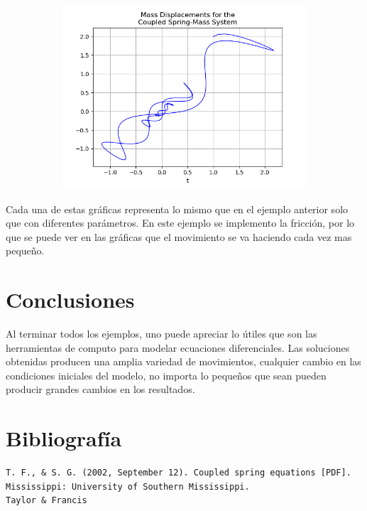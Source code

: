 \documentclass{article}
\begin{document}
\begin{figure}[h!]
\begin{subfigure}[b]{0.45\linewidth}
    \caption{}
  \end{subfigure}
  \begin{subfigure}[b]{0.5\linewidth}
    \includegraphics[width=\linewidth]{two_springs246.png}
    \caption{}
  \end{subfigure}
\end{figure}

\vspace{0.3cm}

Cada una de estas gráficas representa lo mismo que en el ejemplo anterior solo que con diferentes parámetros. En este ejemplo se implemento la fricción, por lo que se puede ver en las gráficas que el movimiento se va haciendo cada vez mas pequeño.

\section{Conclusiones}

Al terminar todos los ejemplos, uno puede apreciar lo útiles que son las herramientas de computo para modelar ecuaciones diferenciales. Las soluciones obtenidas producen una amplia variedad de movimientos, cualquier cambio en las condiciones iniciales del modelo, no importa lo pequeños que sean pueden producir grandes cambios en los resultados.



\section{Bibliografía}

\begin{verbatim}
T. F., & S. G. (2002, September 12). Coupled spring equations [PDF]. 
Mississippi: University of Southern Mississippi.
Taylor & Francis
\end{verbatim}
\end{document}
